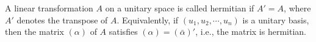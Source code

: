 A linear transformation $A$ on a unitary space is called hermitian if $A' = A$, where $A'$ denotes the transpose of $A$. Equivalently, if $(u_1, u_2, \cdots, u_n)$ is a unitary basis, then the matrix $(\alpha)$ of $A$ satisfies $(\alpha) = (\bar{\alpha})'$, i.e., the matrix is hermitian.
